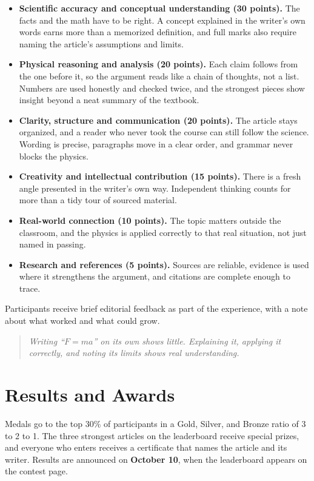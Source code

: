 \documentclass[12pt]{article}
\begin{document}
\begin{itemize}
  \setlength\itemsep{2pt}
  \item \textbf{Scientific accuracy and conceptual understanding (30 points).} The facts and the math have to be right. A concept explained in the writer's own words earns more than a memorized definition, and full marks also require naming the article's assumptions and limits.
  \item \textbf{Physical reasoning and analysis (20 points).} Each claim follows from the one before it, so the argument reads like a chain of thoughts, not a list. Numbers are used honestly and checked twice, and the strongest pieces show insight beyond a neat summary of the textbook.
  \item \textbf{Clarity, structure and communication (20 points).} The article stays organized, and a reader who never took the course can still follow the science. Wording is precise, paragraphs move in a clear order, and grammar never blocks the physics.
  \item \textbf{Creativity and intellectual contribution (15 points).} There is a fresh angle presented in the writer's own way. Independent thinking counts for more than a tidy tour of sourced material.
  \item \textbf{Real-world connection (10 points).} The topic matters outside the classroom, and the physics is applied correctly to that real situation, not just named in passing.
  \item \textbf{Research and references (5 points).} Sources are reliable, evidence is used where it strengthens the argument, and citations are complete enough to trace.
\end{itemize}

Participants receive brief editorial feedback as part of the experience, with a
note about what worked and what could grow.

\begin{quote}
\itshape Writing ``$F = ma$'' on its own shows little. Explaining it,
applying it correctly, and noting its limits shows real understanding.
\end{quote}

\section{Results and Awards}
Medals go to the top 30\% of participants in a Gold, Silver, and Bronze ratio
of 3 to 2 to 1. The three strongest articles on the leaderboard receive special
prizes, and everyone who enters receives a certificate that names the article
and its writer. Results are announced on \textbf{October 10}, when the
leaderboard appears on the contest page.
\end{document}
